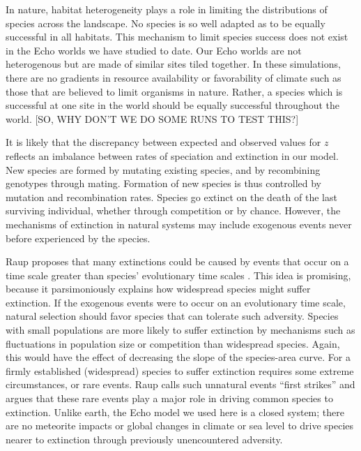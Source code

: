 In nature, habitat heterogeneity plays a role in limiting the
distributions of species across the landscape.  No species is so well
adapted as to be equally successful in all habitats.  This mechanism
to limit species success does not exist in the Echo worlds we have
studied to date.  Our Echo worlds are not heterogenous but are made
of similar sites tiled together.  In these simulations, there are no
gradients in resource availability or favorability of climate such as
those that are believed to limit organisms in nature.  Rather, a
species which is successful at one site in the world should be equally
successful throughout the world.  [SO, WHY DON'T WE DO SOME RUNS TO
TEST THIS?]

It is likely that the discrepancy between expected and observed values
for $z$ reflects an imbalance between rates of speciation and
extinction in our model.  New species are formed by mutating
existing species, and by recombining genotypes through mating.
Formation of new species is thus controlled by mutation and
recombination rates.  Species go extinct on the death of the last
surviving individual, whether through competition or by chance.
However, the mechanisms of extinction in natural systems may include
exogenous events never before experienced by the species.

Raup proposes that many extinctions could be caused by events that
occur on a time scale greater than species' evolutionary time scales
\cite{Raup91}.  This idea is promising, because it parsimoniously
explains how widespread species might suffer extinction.  If the
exogenous events were to occur on an evolutionary time scale, natural
selection should favor species that can tolerate such adversity.
Species with small populations are more likely to suffer extinction by
mechanisms such as fluctuations in population size or competition than
widespread species.  Again, this would have the effect of decreasing the 
slope of the species-area curve.  For a firmly established (widespread) 
species to suffer extinction requires some extreme circumstances, or rare
events.  Raup calls such unnatural events ``first strikes'' and argues
that these rare events play a major role in driving common species
to extinction.  Unlike earth, the Echo model we used here is a closed
system; there are no meteorite impacts or global changes in climate or
sea level to drive species nearer to extinction through previously
unencountered adversity.

